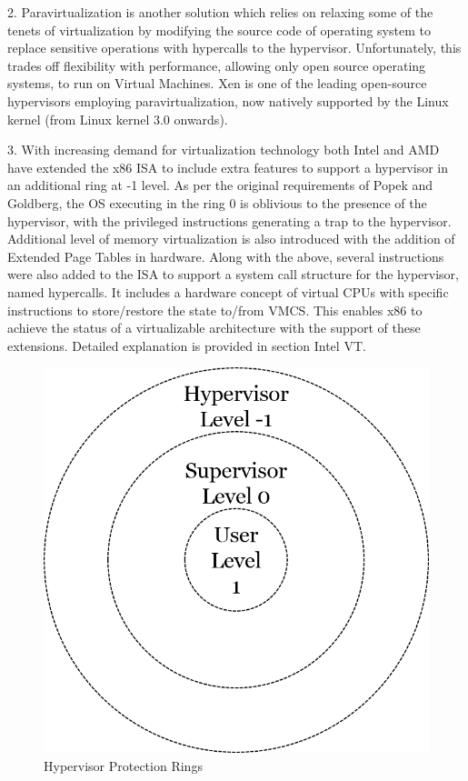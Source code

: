 2. Paravirtualization is another solution which relies on relaxing some of the tenets of virtualization by modifying the source code of operating system to replace sensitive operations with hypercalls to the hypervisor. Unfortunately, this trades off flexibility with performance, allowing only open source operating systems, to run on Virtual Machines. Xen is one of the leading open-source hypervisors employing paravirtualization, now natively supported by the Linux kernel (from Linux kernel 3.0 onwards). 


3. With increasing demand for virtualization technology both Intel and AMD have extended the x86 ISA to include extra features to support a hypervisor in an additional ring at -1 level. As per the original requirements of Popek and Goldberg, the OS executing in the ring 0 is oblivious to the presence of the hypervisor, with the privileged instructions generating a trap to the hypervisor. Additional level of memory virtualization is also introduced with the addition of Extended Page Tables in hardware. Along with the above, several instructions were also added to the ISA to support a system call structure for the hypervisor, named hypercalls. It includes a hardware concept of virtual CPUs with specific instructions to store/restore the state to/from VMCS. This enables x86 to achieve the status of a virtualizable architecture with the support of these extensions. Detailed explanation is provided in section Intel VT. 

\setlength{\belowcaptionskip}{-10pt}

\begin{figure}[H]
  \centering
  \includegraphics[scale=0.6]{figures/protect_hyper.png}
  \caption{Hypervisor Protection Rings}
  \label{fig:hyper_rings}
\end{figure}

